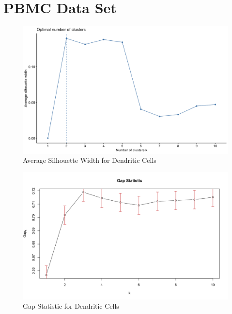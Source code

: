 \documentclass{article}
\begin{document}
\section{PBMC Data Set}

\begin{figure}[H]
\centering
\includegraphics[scale=0.35]{BPCells_silhouette}
\caption{Average Silhouette Width for Dendritic Cells}
\end{figure}

\begin{figure}[H]
\centering
\includegraphics[scale=0.35]{BPCells_gap}
\caption{Gap Statistic for Dendritic Cells}
\end{figure}
\end{document}
